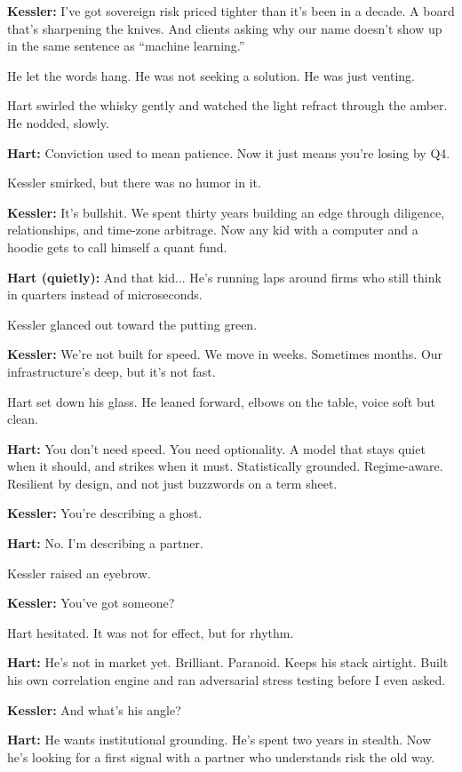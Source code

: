 \textbf{Kessler:}  
I’ve got sovereign risk priced tighter than it’s been in a decade.  
A board that’s sharpening the knives.  
And clients asking why our name doesn’t show up in the same sentence as “machine learning.”

He let the words hang. He was not seeking a solution. He was just venting.

Hart swirled the whisky gently and watched the light refract through the amber. He nodded, slowly.

\textbf{Hart:}  
Conviction used to mean patience.  
Now it just means you’re losing by Q4.

Kessler smirked, but there was no humor in it.

\textbf{Kessler:}  
It’s bullshit.  
We spent thirty years building an edge through diligence, relationships, and time-zone arbitrage.  
Now any kid with a computer and a hoodie gets to call himself a quant fund.

\textbf{Hart (quietly):}  
And that kid...  
He’s running laps around firms who still think in quarters instead of microseconds.

Kessler glanced out toward the putting green.

\textbf{Kessler:}  
We’re not built for speed.  
We move in weeks. Sometimes months.  
Our infrastructure’s deep, but it's not fast.

Hart set down his glass. He leaned forward, elbows on the table, voice soft but clean.

\textbf{Hart:}  
You don’t need speed.  
You need optionality.  
A model that stays quiet when it should, and strikes when it must.  
Statistically grounded. Regime-aware.  
Resilient by design, and not just buzzwords on a term sheet.

\textbf{Kessler:}  
You’re describing a ghost.

\textbf{Hart:}  
No. I’m describing a partner.

Kessler raised an eyebrow.

\textbf{Kessler:}  
You’ve got someone?

Hart hesitated. It was not for effect, but for rhythm.

\textbf{Hart:}  
He’s not in market yet.  
Brilliant. Paranoid. Keeps his stack airtight.  
Built his own correlation engine and ran adversarial stress testing before I even asked.

\textbf{Kessler:}  
And what’s his angle?

\textbf{Hart:}  
He wants institutional grounding.  
He’s spent two years in stealth.  
Now he’s looking for a first signal with a partner who understands risk the old way.

